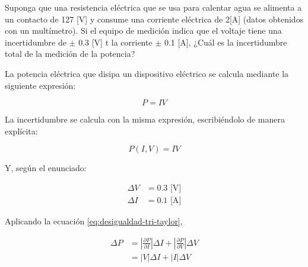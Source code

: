 \begin{ex}

	Suponga que una resistencia eléctrica que se usa para calentar agua se
	alimenta a un contacto de 127 [V] y consume una corriente eléctrica de
	2[A] (datos obtenidos con un multímetro). Si el equipo de medición
	indica que el voltaje tiene una incertidumbre de $\pm$ 0.3 [V] t la
	corriente $\pm$ 0.1 [A], ¿Cuál es la incertidumbre total de la medición de
	la potencia?

	\begin{solution}
		La potencia eléctrica que disipa un dispositivo eléctrico se
		calcula mediante la siguiente expresión:

		\begin{equation*}
			P = IV
		\end{equation*}

		La incertidumbre se calcula con la misma expresión,
		escribiéndolo de manera explícita:

		\begin{equation*}
			P(I, V) = IV
		\end{equation*}

		Y, según el enunciado:

		\begin{align*}
			\Delta V &= 0.3 \text{ [V]} \\
			\Delta I &= 0.1 \text{ [A]}
		\end{align*}


		Aplicando la ecuación \ref{eq:desigualdad-tri-taylor},

		\begin{align*}
			\Delta P &=
			\left| \frac{\partial P}{\partial I} \right| \Delta I +
			\left| \frac{\partial P}{\partial V} \right| \Delta V \\
				 &= \left| V \right| \Delta I + \left| I\right|
				 \Delta V
		\end{align*}



	\end{solution}
\end{ex}


